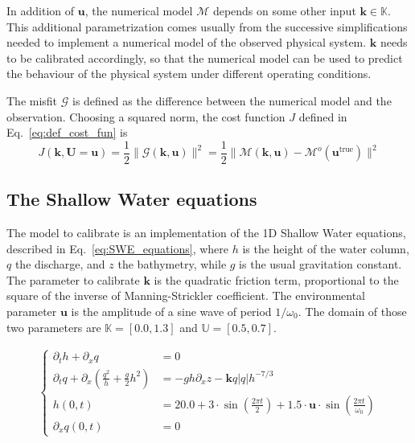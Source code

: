 \documentclass[preprint, 1p]{elsarticle}
\newcommand{\Kspace}{\mathbb{K}}
\newcommand{\Uspace}{\mathbb{U}}
\begin{document}
 
In addition of $\mathbf{u}$, the numerical model $\mathcal{M}$ depends on some other input $\mathbf{k}\in\Kspace$. This additional parametrization comes usually from the successive simplifications needed to implement a numerical model of the observed physical system. $\mathbf{k}$ needs to be calibrated accordingly, so that the numerical model can be used to predict the behaviour of the physical system under different operating conditions.

The misfit $\mathcal{G}$ is defined as the difference between the numerical model and the observation. Choosing a squared norm, the cost function $J$ defined in Eq.~\eqref{eq:def_cost_fun} is
\begin{equation}
J(\mathbf{k},\mathbf{U}=\mathbf{u}) = \frac12 \| \mathcal{G}(\mathbf{k},\mathbf{u}) \|^2 = \frac12 \|\mathcal{M}(\mathbf{k},\mathbf{u}) - \mathcal{M}^{o}(\mathbf{u}^{\mathrm{true}}) \|^2
\end{equation}
\subsection{The Shallow Water equations}

The model to calibrate is an implementation of the 1D Shallow Water equations, described in Eq.~\eqref{eq:SWE_equations}, where $h$ is the height of the water column, $q$ the discharge, and $z$ the bathymetry, while $g$ is the usual gravitation constant. The parameter to calibrate $\mathbf{k}$ is the quadratic friction term, proportional to the square of the inverse of Manning-Strickler coefficient. The environmental parameter $\mathbf{u}$ is the amplitude of a sine wave of period $1/\omega_0$. The domain of those two parameters are $\Kspace = [0.0, 1.3]$ and $\Uspace = [0.5, 0.7]$.


\begin{align}
  \label{eq:SWE_equations}
  \left\{
    \begin{array}{rl}
      \partial_t h + \partial_x q &= 0 \\
      \partial_t q + \partial_x \left(\frac{q^2}{h} + \frac{g}{2}h^2\right) &= - gh\partial_x z - \mathbf{k}q |q|h^{-7/3} \\
      h(0, t) &= 20.0 + 3\cdot \sin \left(\frac{2\pi t}{2}\right) + 1.5\cdot \mathbf{u} \cdot \sin\left(\frac{2 \pi t}{\omega_0}\right)\\
      \partial_x q(0, t) &= 0
      \end{array}
  \right.
\end{align}
\end{document}
